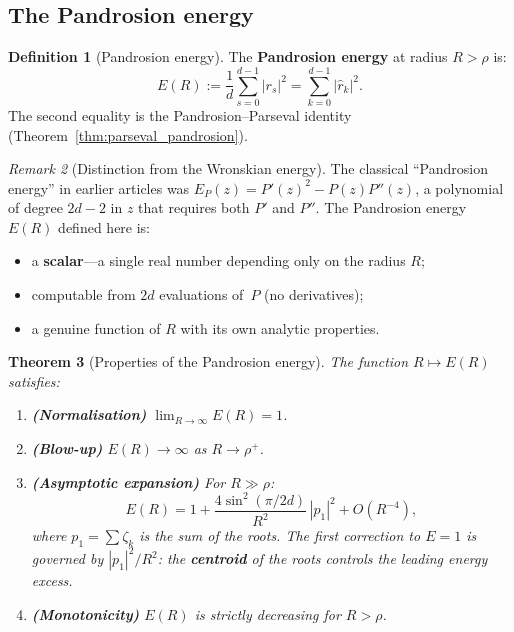 \documentclass[10pt,a4paper,oneside]{book}
\newtheorem{theorem}{Theorem}[chapter]
\theoremstyle{definition}
\newtheorem{definition}[theorem]{Definition}
\theoremstyle{remark}
\newtheorem{remark}[theorem]{Remark}
\begin{document}
\subsection{The Pandrosion energy}
\label{sec:pand_energy}

\begin{definition}[Pandrosion energy]
\label{def:pand_energy}
The \textbf{Pandrosion energy} at radius $R > \rho$ is:
\begin{equation}
\label{eq:pand_energy}
\boxed{E(R) := \frac{1}{d}\sum_{s=0}^{d-1}|r_s|^2 = \sum_{k=0}^{d-1}|\hat{r}_k|^2.}
\end{equation}
The second equality is the Pandrosion--Parseval identity (Theorem~\ref{thm:parseval_pandrosion}).
\end{definition}

\begin{remark}[Distinction from the Wronskian energy]
The classical ``Pandrosion energy'' in earlier articles was $E_P(z) = P'(z)^2 - P(z)P''(z)$, a polynomial of degree $2d-2$ in $z$ that requires both $P'$ and $P''$.  The Pandrosion energy $E(R)$ defined here is:
\begin{itemize}
\item a \textbf{scalar}---a single real number depending only on the radius $R$;
\item computable from $2d$ evaluations of~$P$ (no derivatives);
\item a genuine function of $R$ with its own analytic properties.
\end{itemize}
\end{remark}

\begin{theorem}[Properties of the Pandrosion energy]
\label{thm:energy_properties}
The function $R \mapsto E(R)$ satisfies:
\begin{enumerate}
\item \textbf{(Normalisation)} $\lim_{R \to \infty} E(R) = 1$.
\item \textbf{(Blow-up)} $E(R) \to \infty$ as $R \to \rho^+$.
\item \textbf{(Asymptotic expansion)} For $R \gg \rho$:
\begin{equation}
\label{eq:energy_asymptotic}
E(R) = 1 + \frac{4\sin^2(\pi/2d)}{R^2}\,|p_1|^2 + O(R^{-4}),
\end{equation}
where $p_1 = \sum \zeta_k$ is the sum of the roots.  The first correction to $E = 1$ is governed by $|p_1|^2/R^2$: the \textbf{centroid} of the roots controls the leading energy excess.
\item \textbf{(Monotonicity)} $E(R)$ is strictly decreasing for $R > \rho$.
\end{enumerate}
\end{theorem}
\end{document}
